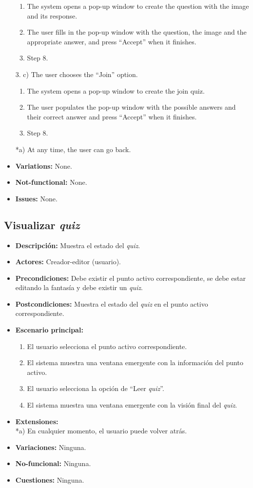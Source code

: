 \begin{itemize}
	\begin{enumerate}
		\item The system opens a pop-up window to create the question with the image and its response.
		\item The user fills in the pop-up window with the question, the image and the appropriate answer, and press ``Accept'' when it finishes.
		\item Step 8.
	\end{enumerate}
	3. c) The user chooses the ``Join'' option.
	\begin{enumerate}
		\item The system opens a pop-up window to create the join quiz.
		\item The user populates the pop-up window with the possible answers and their correct answer and press ``Accept'' when it finishes.
		\item Step 8.
	\end{enumerate}
	*a) At any time, the user can go back.
	\item \textbf{Variations:} None.
	\item \textbf{Not-functional:} None.
	\item \textbf{Issues:} None.
\end{itemize}

\subsection{Visualizar \textit{quiz}}
\begin{itemize}
	\item \textbf{Descripción:} Muestra el estado del \textit{quiz}.
	\item \textbf{Actores:} Creador-editor (usuario).
	\item \textbf{Precondiciones:} Debe existir el punto activo correspondiente, se debe estar editando la fantasía y debe existir un \textit{quiz}.
	\item \textbf{Postcondiciones:} Muestra el estado del \textit{quiz} en el punto activo correspondiente.
	\item \textbf{Escenario principal:}
	\begin{enumerate}
		\item El usuario selecciona el punto activo correspondiente.
		\item El sistema muestra una ventana emergente con la información del punto activo.
		\item El usuario selecciona la opción de ``Leer \textit{quiz}''.
		\item El sistema muestra una ventana emergente con la visión final del \textit{quiz}.
	\end{enumerate}
	\item \textbf{Extensiones:} \\ *a) En cualquier momento, el usuario puede volver atrás.
	\item \textbf{Variaciones:} Ninguna.
	\item \textbf{No-funcional:} Ninguna.
	\item \textbf{Cuestiones:} Ninguna.
\end{itemize}

